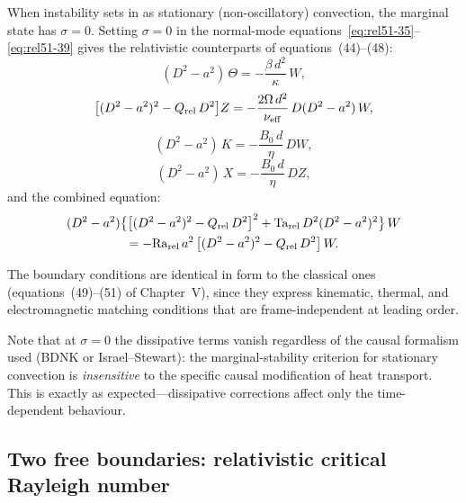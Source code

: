 When instability sets in as stationary (non-oscillatory) convection,
the marginal state has $\sigma = 0$.  Setting $\sigma=0$ in the
normal-mode equations~\eqref{eq:rel51-35}--\eqref{eq:rel51-39} gives
the relativistic counterparts of equations~(44)--(48):
\begin{equation}
  (D^{2}-a^{2})\,\Theta
  = -\frac{\beta\,d^{2}}{\kappa}\,W,
  \label{eq:rel52-44}
\end{equation}
\begin{equation}
  \bigl[(D^{2}-a^{2})^{2}-Q_{\mathrm{rel}}\,D^{2}\bigr]Z
  = -\frac{2\Omega\,d^{2}}{\nu_{\mathrm{eff}}}\,
    D(D^{2}-a^{2})\,W,
  \label{eq:rel52-45}
\end{equation}
\begin{equation}
  (D^{2}-a^{2})\,K
  = -\frac{B_{0}\,d}{\eta}\,DW,
  \label{eq:rel52-46}
\end{equation}
\begin{equation}
  (D^{2}-a^{2})\,X
  = -\frac{B_{0}\,d}{\eta}\,DZ,
  \label{eq:rel52-47}
\end{equation}
and the combined equation:
\begin{multline}
  (D^{2}-a^{2})
  \bigl\{\bigl[(D^{2}-a^{2})^{2}-Q_{\mathrm{rel}}\,D^{2}\bigr]^{2}
  +\mathrm{Ta}_{\mathrm{rel}}\,D^{2}(D^{2}-a^{2})^{2}\bigr\}\,W\\
  = -\mathrm{Ra}_{\mathrm{rel}}\,a^{2}\,
    \bigl[(D^{2}-a^{2})^{2}-Q_{\mathrm{rel}}\,D^{2}\bigr]\,W.
  \label{eq:rel52-48}
\end{multline}

The boundary conditions are identical in form to the classical ones
(equations~(49)--(51) of Chapter~V), since they express kinematic,
thermal, and electromagnetic matching conditions that are
frame-independent at leading order.

Note that at $\sigma=0$ the dissipative terms vanish regardless of
the causal formalism used (BDNK or Israel--Stewart): the
marginal-stability criterion for stationary convection is
\emph{insensitive} to the specific causal modification of heat
transport.  This is exactly as expected---dissipative corrections
affect only the time-dependent behaviour.

\subsection{Two free boundaries: relativistic critical Rayleigh number}
\label{sec:two-free-bdry}

